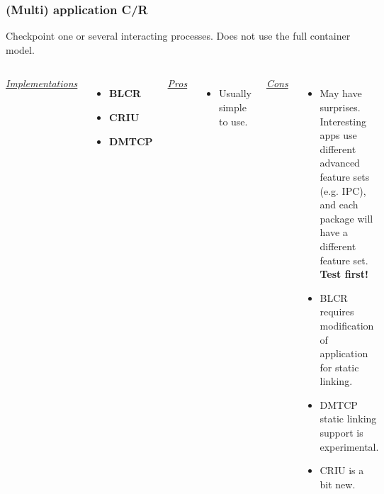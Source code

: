\documentclass[compress]{beamer}
\begin{document}
\begin{frame}
\frametitle{(Multi) application C/R}

Checkpoint one or several interacting processes. Does not use the full container model.

\begin{columns}[t]
\ul{\textit{Implementations}}
\begin{itemize}
\item \textbf{BLCR}
\item \textbf{CRIU}
\item \textbf{DMTCP}
\end{itemize}

\ul{\textit{Pros}}
\begin{itemize}
\item Usually simple to use.
\end{itemize}

\ul{\textit{Cons}}
\begin{itemize}
\item May have surprises. Interesting apps use different
advanced feature sets (e.g. IPC), and each package
will have a different feature set. \textbf{Test first!}
\item BLCR requires modification of application for static linking.
\item DMTCP static linking support is experimental.
\item CRIU is a bit new.
\end{itemize}

\end{columns}






\end{frame}
  
\end{document}
